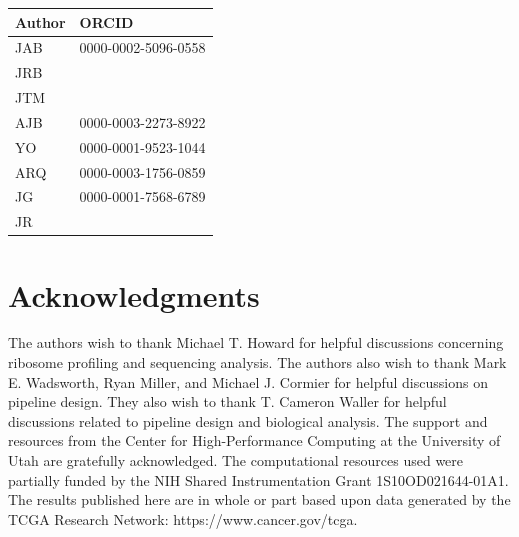 \documentclass[10pt, oneside]{article}
\newcommand{\beginsupplement}{%
  \setcounter{table}{0}
  \renewcommand{\thetable}{S\arabic{table}}%
  \setcounter{figure}{0}
  \renewcommand{\thefigure}{S\arabic{figure}}%
}
\begin{document}
\begin{table}[!]
    \centering
{}
\begin{tabular}{p{2.4cm}p{7.5cm}}
 \textbf{Author} & \textbf{ORCID}\\
 \hline
 JAB & 0000-0002-5096-0558 \\
 \hline
 JRB & \\
 \hline
 JTM & \\
 \hline
 AJB & 0000-0003-2273-8922 \\
 \hline
 YO & 0000-0001-9523-1044 \\
 \hline
 ARQ & 0000-0003-1756-0859 \\
 \hline
 JG & 0000-0001-7568-6789 \\
 \hline
 JR & \\
\end{tabular}
\end{table}

\section*{Acknowledgments}
The authors wish to thank Michael T. Howard for helpful discussions concerning ribosome profiling and sequencing analysis. The authors also wish to thank Mark E. Wadsworth, Ryan Miller, and Michael J. Cormier for helpful discussions on pipeline design. They also wish to thank T. Cameron Waller for helpful discussions related to pipeline design and biological analysis. The support and resources from the Center for High-Performance Computing at the University of Utah are gratefully acknowledged. The computational resources used were partially funded by the NIH Shared Instrumentation Grant 1S10OD021644-01A1. The results published here are in whole or part based upon data generated by the TCGA Research Network: https://www.cancer.gov/tcga.




\beginsupplement
\end{document}
